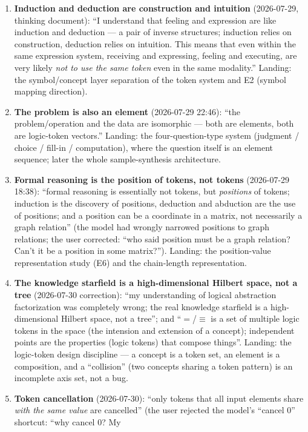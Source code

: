 \documentclass[sigplan,10pt,anonymous,review]{acmart}
\begin{document}
\begin{enumerate}
\item \textbf{Induction and deduction are construction and intuition}
(2026-07-29, thinking document): ``I understand that feeling and expression
are like induction and deduction --- a pair of inverse structures;
induction relies on construction, deduction relies on intuition. This
means that even within the same expression system, receiving and
expressing, feeling and executing, are very likely \emph{not to use the
same token} even in the same modality.'' Landing: the symbol/concept layer
separation of the token system and E2 (symbol mapping direction).
\item \textbf{The problem is also an element} (2026-07-29 22:46): ``the
problem/operation and the data are isomorphic --- both are elements, both
are logic-token vectors.'' Landing: the four-question-type system
(judgment / choice / fill-in / computation), where the question itself is
an element sequence; later the whole sample-synthesis architecture.
\item \textbf{Formal reasoning is the position of tokens, not tokens}
(2026-07-29 18:38): ``formal reasoning is essentially not tokens, but
\emph{positions} of tokens; induction is the discovery of positions,
deduction and abduction are the use of positions; and a position can be a
coordinate in a matrix, not necessarily a graph relation'' (the model had
wrongly narrowed positions to graph relations; the user corrected:
``who said position must be a graph relation? Can't it be a position in
some matrix?''). Landing: the position-value representation study (E6) and
the chain-length representation.
\item \textbf{The knowledge starfield is a high-dimensional Hilbert space,
not a tree} (2026-07-30 correction): ``my understanding of logical
abstraction factorization was completely wrong; the real knowledge
starfield is a high-dimensional Hilbert space, not a tree''; and ``$=$/$\equiv$
is a set of multiple logic tokens in the space (the intension and
extension of a concept); independent points are the properties (logic
tokens) that compose things''. Landing: the logic-token design discipline
--- a concept is a token set, an element is a composition, and a
``collision'' (two concepts sharing a token pattern) is an incomplete axis
set, not a bug.
\item \textbf{Token cancellation} (2026-07-30): ``only tokens that all
input elements share \emph{with the same value} are cancelled'' (the
user rejected the model's ``cancel 0'' shortcut: ``why cancel 0? My

\end{enumerate}
\end{document}
